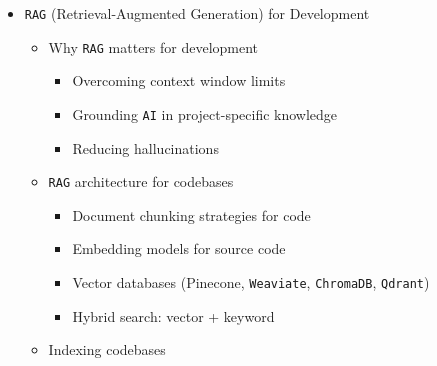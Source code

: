 \documentclass[
]{article}
\providecommand{\tightlist}{%
  \setlength{\itemsep}{0pt}\setlength{\parskip}{0pt}}
\begin{document}
\begin{itemize}
\begin{itemize}
    \begin{itemize}
    \tightlist
    \item
      Code review skills
    \item
      Commit message generation
    \item
      PR creation workflows
    \item
      Deployment skills
    \item
      Database migration skills
    \end{itemize}
  \item
    Sharing skills across teams
  \item
    Hooks: automating actions around tool calls

    \begin{itemize}
    \tightlist
    \item
      Pre and post-execution hooks
    \item
      Notification hooks
    \item
      Validation and guard hooks
    \end{itemize}
  \end{itemize}
\item
  \texttt{RAG} (Retrieval-Augmented Generation) for Development

  \begin{itemize}
  \tightlist
  \item
    Why \texttt{RAG} matters for development

    \begin{itemize}
    \tightlist
    \item
      Overcoming context window limits
    \item
      Grounding \texttt{AI} in project-specific knowledge
    \item
      Reducing hallucinations
    \end{itemize}
  \item
    \texttt{RAG} architecture for codebases

    \begin{itemize}
    \tightlist
    \item
      Document chunking strategies for code
    \item
      Embedding models for source code
    \item
      Vector databases (Pinecone, \texttt{Weaviate}, \texttt{ChromaDB},
      \texttt{Qdrant})
    \item
      Hybrid search: vector + keyword
    \end{itemize}
  \item
    Indexing codebases


\end{itemize}
\end{itemize}
\end{document}

